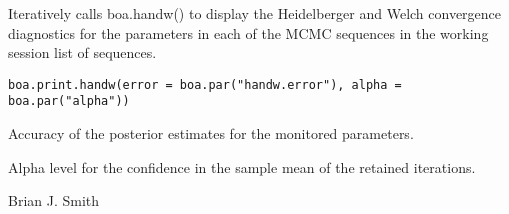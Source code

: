 \begin{Description}\relax
Iteratively calls boa.handw() to display the Heidelberger and Welch 
convergence diagnostics for the parameters in each of the MCMC sequences 
in the working session list of sequences.
\end{Description}
\begin{Usage}
\begin{verbatim}
boa.print.handw(error = boa.par("handw.error"), alpha = boa.par("alpha"))
\end{verbatim}
\end{Usage}
\begin{Arguments}
\begin{ldescription}
\item[\code{error}] Accuracy of the posterior estimates for the monitored parameters.
\item[\code{alpha}] Alpha level for the confidence in the sample mean of the retained 
iterations.
\end{ldescription}
\end{Arguments}
\begin{Author}\relax
Brian J. Smith
\end{Author}
\begin{SeeAlso}\relax
{}
\end{SeeAlso}

